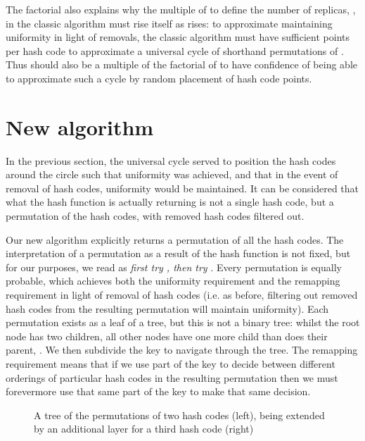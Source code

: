 \documentclass[runningheads,a4paper]{llncs}
\begin{document}
The factorial also explains why the multiple of  to define the
number of replicas, , in the classic algorithm must rise itself as
 rises: to approximate maintaining uniformity in light of
removals, the classic algorithm must have sufficient points per hash
code to approximate a universal cycle of shorthand permutations of
. Thus  should also be a multiple of the factorial of  to
have confidence of being able to approximate such a cycle by random
placement of hash code points.


\section{New algorithm}

In the previous section, the universal cycle served to position the
hash codes around the circle such that uniformity was achieved, and
that in the event of removal of hash codes, uniformity would be
maintained. It can be considered that what the hash function is
actually returning is not a single hash code, but a permutation of the
hash codes, with removed hash codes filtered out.

Our new algorithm explicitly returns a permutation of all the hash
codes. The interpretation of a permutation as a result of the hash
function is not fixed, but for our purposes, we read 
as {\em first try , then try }. Every permutation is
equally probable, which achieves both the uniformity requirement and
the remapping requirement in light of removal of hash codes (i.e. as
before, filtering out removed hash codes from the resulting
permutation will maintain uniformity). Each permutation exists as a
leaf of a tree, but this is not a binary tree: whilst the root node
has two children, all other nodes have one more child than does their
parent, . We then subdivide the key to navigate
through the tree. The remapping requirement means that if we use part
of the key to decide between different orderings of particular hash
codes in the resulting permutation then we must forevermore use that
same part of the key to make that same decision.

\begin{figure}
\begin{center}

\end{center}
\caption{A tree of the permutations of two hash codes (left), being extended by an additional layer for a third hash code (right)}
\label{fig:tree-2-add}
\end{figure}
\end{document}
